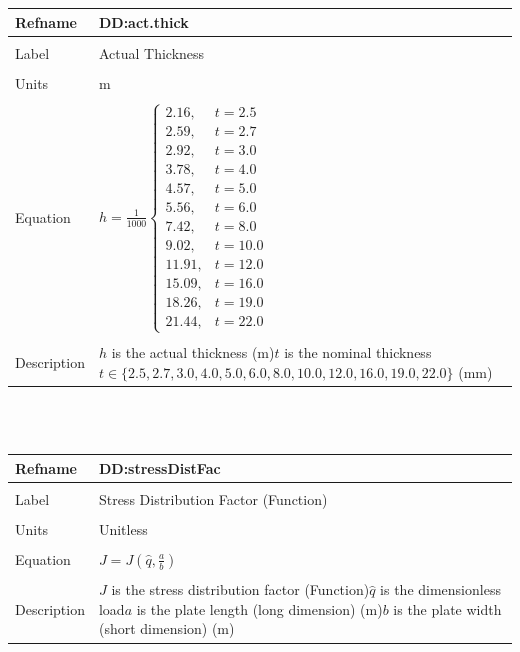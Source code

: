 \documentclass[12pt]{article}
\begin{document}
\noindent \begin{minipage}{\textwidth}
\begin{tabular}{p{} p{}}
\toprule \textbf{Refname} & \textbf{DD:act.thick}
\label{DD:act.thick}
\\ \midrule \\
Label & Actual Thickness
\\ \midrule \\
Units & m
\\ \midrule \\
Equation & $h=\frac{1}{1000} \begin{cases}
2.16, & t=2.5\\
2.59, & t=2.7\\
2.92, & t=3.0\\
3.78, & t=4.0\\
4.57, & t=5.0\\
5.56, & t=6.0\\
7.42, & t=8.0\\
9.02, & t=10.0\\
11.91, & t=12.0\\
15.09, & t=16.0\\
18.26, & t=19.0\\
21.44, & t=22.0
\end{cases}$
\\ \midrule \\
Description & $h$ is the actual thickness (m)\newline$t$ is the nominal thickness $t\in{}\{2.5,2.7,3.0,4.0,5.0,6.0,8.0,10.0,12.0,16.0,19.0,22.0\}$ (mm)
\\ \bottomrule \end{tabular}
\end{minipage}\\
~\newline
\noindent \begin{minipage}{\textwidth}
\begin{tabular}{p{} p{}}
\toprule \textbf{Refname} & \textbf{DD:stressDistFac}
\label{DD:stressDistFac}
\\ \midrule \\
Label & Stress Distribution Factor (Function)
\\ \midrule \\
Units & Unitless
\\ \midrule \\
Equation & $J=J\left(\hat{q},\frac{a}{b}\right)$
\\ \midrule \\
Description & $J$ is the stress distribution factor (Function)\newline$\hat{q}$ is the dimensionless load\newline$a$ is the plate length (long dimension) (m)\newline$b$ is the plate width (short dimension) (m)
\\ \bottomrule \end{tabular}
\end{minipage}\\
\end{document}
